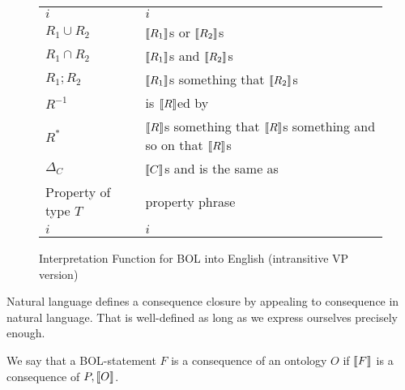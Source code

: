 \begin{figure}
\begin{tabular}{l|l}
$i$ & $i$\\
$R_1 \cup R_2$ & $\llbracket R_1\rrbracket$s or $\llbracket R_2\rrbracket$s\\
$R_1 \cap R_2$ & $\llbracket R_1\rrbracket$s and $\llbracket R_2\rrbracket$s\\
$R_1 ; R_2$ & $\llbracket R_1\rrbracket$s something that $\llbracket R_2\rrbracket$s\\
$R^{-1}$    & is $\llbracket R\rrbracket$ed by\\
$R^*$       & $\llbracket R\rrbracket$s something that $\llbracket R\rrbracket$s something and so on that $\llbracket R\rrbracket$s\\
$\Delta_C$  & $\llbracket C\rrbracket$s and is the same as\\
\hline
Property of type $T$ & property phrase\\
$i$ & $i$\\
\end{tabular}
\caption{Interpretation Function for BOL into English (intransitive VP version)}\label{fig:bolsem:eng}
\end{figure}

Natural language defines a consequence closure by appealing to consequence in natural language.
That is well-defined as long as we express ourselves precisely enough.
\begin{definition}
We say that a BOL-statement $F$ is a consequence of an ontology $O$ if $\llbracket F\rrbracket$ is a consequence of $P,\llbracket O\rrbracket$.
\end{definition}

